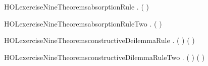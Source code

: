\newcommand{\HOLexerciseNineDate}{30 January 2020}
\newcommand{\HOLexerciseNineTime}{20:37}
\begin{SaveVerbatim}{HOLexerciseNineTheoremsabsorptionRule}
\HOLTokenTurnstile{} \HOLSymConst{\HOLTokenForall{}} . ( \HOLSymConst{\HOLTokenImp{}} ) \HOLSymConst{\HOLTokenImp{}}  \HOLSymConst{\HOLTokenImp{}}  \HOLSymConst{\HOLTokenConj{}} 
\end{SaveVerbatim}
\newcommand{\HOLexerciseNineTheoremsabsorptionRule}{\UseVerbatim{HOLexerciseNineTheoremsabsorptionRule}}
\begin{SaveVerbatim}{HOLexerciseNineTheoremsabsorptionRuleTwo}
\HOLTokenTurnstile{} \HOLSymConst{\HOLTokenForall{}} . ( \HOLSymConst{\HOLTokenImp{}} ) \HOLSymConst{\HOLTokenImp{}}  \HOLSymConst{\HOLTokenImp{}}  \HOLSymConst{\HOLTokenConj{}} 
\end{SaveVerbatim}
\newcommand{\HOLexerciseNineTheoremsabsorptionRuleTwo}{\UseVerbatim{HOLexerciseNineTheoremsabsorptionRuleTwo}}
\begin{SaveVerbatim}{HOLexerciseNineTheoremsconstructiveDeilemmaRule}
\HOLTokenTurnstile{} \HOLSymConst{\HOLTokenForall{}}   . ( \HOLSymConst{\HOLTokenImp{}} ) \HOLSymConst{\HOLTokenConj{}} ( \HOLSymConst{\HOLTokenImp{}} ) \HOLSymConst{\HOLTokenImp{}}  \HOLSymConst{\HOLTokenDisj{}}  \HOLSymConst{\HOLTokenImp{}}  \HOLSymConst{\HOLTokenDisj{}} 
\end{SaveVerbatim}
\newcommand{\HOLexerciseNineTheoremsconstructiveDeilemmaRule}{\UseVerbatim{HOLexerciseNineTheoremsconstructiveDeilemmaRule}}
\begin{SaveVerbatim}{HOLexerciseNineTheoremsconstructiveDilemmaRuleTwo}
\HOLTokenTurnstile{} \HOLSymConst{\HOLTokenForall{}}   . ( \HOLSymConst{\HOLTokenImp{}} ) \HOLSymConst{\HOLTokenConj{}} ( \HOLSymConst{\HOLTokenImp{}} ) \HOLSymConst{\HOLTokenImp{}}  \HOLSymConst{\HOLTokenDisj{}}  \HOLSymConst{\HOLTokenImp{}}  \HOLSymConst{\HOLTokenDisj{}} 
\end{SaveVerbatim}
\newcommand{\HOLexerciseNineTheoremsconstructiveDilemmaRuleTwo}{\UseVerbatim{HOLexerciseNineTheoremsconstructiveDilemmaRuleTwo}}
\newcommand{\HOLexerciseNineTheorems}{
\HOLThmTag{exercise9}{absorptionRule}\HOLexerciseNineTheoremsabsorptionRule
\HOLThmTag{exercise9}{absorptionRule2}\HOLexerciseNineTheoremsabsorptionRuleTwo
\HOLThmTag{exercise9}{constructiveDeilemmaRule}\HOLexerciseNineTheoremsconstructiveDeilemmaRule
\HOLThmTag{exercise9}{constructiveDilemmaRule2}\HOLexerciseNineTheoremsconstructiveDilemmaRuleTwo
}
